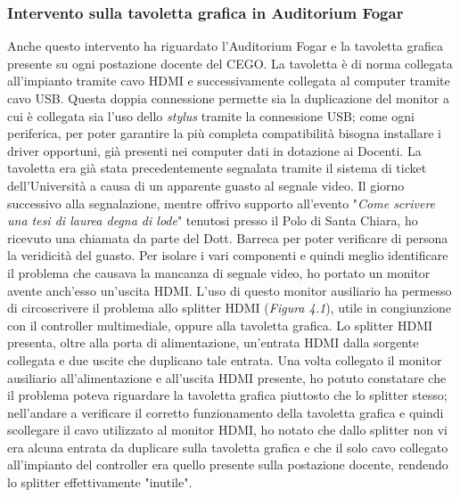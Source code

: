             \subsubsection{Intervento sulla tavoletta grafica in Auditorium Fogar}
                    Anche questo intervento ha riguardato l'Auditorium Fogar e la tavoletta grafica presente su ogni postazione docente del CEGO. La tavoletta è di norma collegata all'impianto tramite cavo HDMI e successivamente collegata al computer tramite cavo USB. Questa doppia connessione permette sia la duplicazione del monitor a cui è collegata sia l'uso dello \textsl{stylus} tramite la connessione USB; come ogni periferica, per poter garantire la più completa compatibilità bisogna installare i driver opportuni, già presenti nei computer dati in dotazione ai Docenti. \newline
                    La tavoletta era già stata precedentemente segnalata tramite il sistema di ticket dell'Università a causa di un apparente guasto al segnale video. Il giorno successivo alla segnalazione, mentre offrivo supporto all'evento "\textsl{Come scrivere una tesi di laurea degna di lode}" tenutosi presso il Polo di Santa Chiara, ho ricevuto una chiamata da parte del Dott. Barreca per poter verificare di persona la veridicità del guasto. \newline
                    Per isolare i vari componenti e quindi meglio identificare il problema che causava la mancanza di segnale video, ho portato un monitor avente anch'esso un'uscita HDMI. L'uso di questo monitor ausiliario ha permesso di circoscrivere il problema allo splitter HDMI (\textit{Figura 4.1}), utile in congiunzione con il controller multimediale, oppure alla tavoletta grafica. Lo splitter HDMI presenta, oltre alla porta di alimentazione, un'entrata HDMI dalla sorgente collegata e due uscite che duplicano tale entrata. \newline
                    Una volta collegato il monitor ausiliario all'alimentazione e all'uscita HDMI presente, ho potuto constatare che il problema poteva riguardare la tavoletta grafica piuttosto che lo splitter stesso; nell'andare a verificare il corretto funzionamento della tavoletta grafica e quindi scollegare il cavo utilizzato al monitor HDMI, ho notato che dallo splitter non vi era alcuna entrata da duplicare sulla tavoletta grafica e che il solo cavo collegato all'impianto del controller era quello presente sulla postazione docente, rendendo lo splitter effettivamente "inutile". \newline
